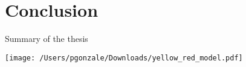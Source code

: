 \documentclass[9pt,compress]{beamer}
\begin{document}
\section{Conclusion}
{
\begin{frame}
\begin{center}
\LARGE {\color{beamer@blendedblue} Summary of the thesis}
\end{center}
\end{frame}}
%
%
%
\begin{frame}%
\begin{center}
\texttt{[image: /Users/pgonzale/Downloads/yellow\_red\_model.pdf]}
 \end{center}    
\end{frame}
%
%
%
\end{document}
